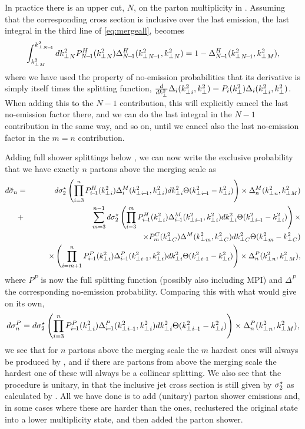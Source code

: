 In practice there is an upper cut, $N$, on the parton multiplicity in
\HEJ. Assuming that the corresponding cross section is inclusive over
the last emission, the last integral in the third line of
\cref{eq:mergeall}, becomes
\begin{equation}
  \label{eq:mergelast}
  \int_{\kti{M}}^{\kti{N\!-\!1}}d\kti{N}
  P^H_{N\!-\!1}(\kti{N})\Delta_{N\!-\!1}^H(\kti{N\!-\!1},\kti{N})=
  1-\Delta_{N\!-\!1}^H(\kti{N\!-\!1},\kti{M}),
\end{equation}
where we have used the property of no-emission probabilities that its
derivative is simply itself times the splitting function,
$\frac{d}{dk_\perp^2}\Delta_{i}({k^2_\perp}_{i},k_\perp^2)=P_{i}(k_\perp^2)\Delta_{i}({k^2_\perp}_{i},k_\perp^2)$. When adding this to
the $N-1$ contribution, this will explicitly cancel the last
no-emission factor there, and we can do the last integral in the $N-1$
contribution in the same way, and so on, until we cancel also the last
no-emission factor in the $m=n$ contribution.

Adding full \pyt shower splittings below , we can now write the
exclusive probability that we have exactly $n$ partons above the merging
scale as
\begin{eqnarray}
  \label{eq:mergingtotal}
  d\tilde{\sigma}_{n}&=&
  d\sigmab \left(\prod_{i=3}^nP_{i\!-\!1}^H(\kti{i})\Delta^M_i(\kti{i\!-\!1},\kti{i})
    d\kti{i}\Theta(\kti{i\!-\!1}-\kti{i})\right)\times\Delta^M_n(\kti{n},\kti{M})\nonumber\\
  &+&\sum_{m=3}^{n-1}d\sigmab 
  \left(\prod_{i=3}^mP^H_{i\!-\!1}(\kti{i})
    \Delta^M_{i\!-\!1}(\kti{i\!-\!1},\kti{i})d\kti{i}\Theta(\kti{i\!-\!1}-\kti{i})\right)
  \times\nonumber\\
  & &\qquad\times P^C_m(\kti{C})\Delta^M(\kti{m},\kti{C})d\kti{C}\Theta(\kti{m}-\kti{C})\\
  & &\qquad\times \left(\prod_{i=m+1}^nP^P_{i\!-\!1}(\kti{i})
    \Delta^P_{i\!-\!1}(\kti{i\!-\!1},\kti{i})d\kti{i}\Theta(\kti{i\!-\!1}-\kti{i})\right)
  \times\Delta^P_n(\kti{n},\kti{M}),\nonumber
\end{eqnarray}
where $P^P$ is now the full \pyt splitting function (possibly also
including MPI) and $\Delta^P$ the corresponding no-emission
probability. Comparing this with what \pyt would give on its own,
\begin{equation}
  \label{eq:justpythia}
  d\sigma_n^P=
  d\sigmab \left(\prod_{i=3}^nP_{i\!-\!1}^P(\kti{i})\Delta_{i\!-\!1}^P(\kti{i\!-\!1},\kti{i})
    d\kti{i}\Theta(\kti{i\!-\!1}-\kti{i})\right)\times\Delta_{n}^P(\kti{n},\kti{M}),
\end{equation}
we see that for $n$ partons above the merging scale the $m$ hardest
ones will always be produced by \HEJ, and if there are partons from
\pyt above the merging scale the hardest one of these will always be a
collinear splitting.
We also see that the procedure is unitary,
  in that the inclusive jet cross section is still given by $\sigma_2^{\star}$
  as calculated by \HEJ. All we have done is to add (unitary) parton
  shower emissions and, in some cases where these are harder than the
  \HEJ ones, reclustered the original \HEJ state into a lower
  multiplicity state, and then added the parton shower.

